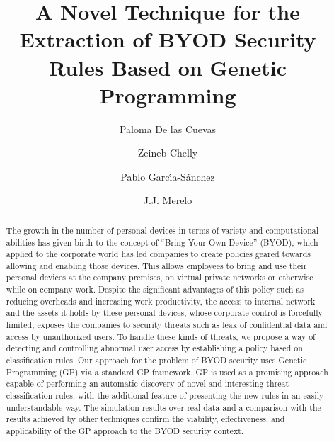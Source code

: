 \documentclass[a4paper,10pt,twocolumn,preprint,3p]{elsarticle}
\begin{document}
\begin{frontmatter}

\title{A Novel Technique for the Extraction of BYOD Security Rules Based on Genetic Programming}

\author[ugr]{Paloma De las Cuevas}
\author[isgt]{Zeineb Chelly}
\author[ugr]{Pablo Garc\'{\i}a-S\'anchez}
\author[ugr]{J.J. Merelo}

\address[ugr]{Department of Computer Architecture and Computer Technology, ETSIIT and CITIC \\
University of Granada, Granada, Spain. Tel: +34958241778. Fax: +34958248993}
\address[isgt]{LARODEC, Institut Sup\'erieur de Gestion de Tunis, Tunisia.}


\begin{abstract}
The growth in the number of personal devices in terms of variety and
computational %
abilities has given birth to the concept of ``Bring Your Own Device''
(BYOD), which applied to the corporate world has led companies to
create policies geared towards allowing and enabling those devices. %
This allows %
employees to bring and use their personal devices at
the company premises, on virtual private networks or otherwise while
on company work. Despite the significant advantages of this policy
such as reducing overheads and increasing work productivity, 
the
access to internal network and the assets it holds by these personal
devices, whose corporate control is forcefully limited, exposes the companies to
security threats such as leak of confidential data and access by
unauthorized users. %
To handle these kinds of threats, we propose a way of detecting and controlling abnormal user
access by establishing a policy based on classification rules. Our
approach for the problem of BYOD security uses Genetic Programming
(GP) via a standard GP framework. GP is used as a promising approach %
capable of performing an automatic discovery of novel and interesting
threat classification rules, with the additional feature of presenting
the new rules in an easily understandable way. %
The simulation results over real data and a
comparison with the results achieved by other techniques confirm the
viability, effectiveness, and applicability of the GP approach to the
BYOD security context.
\end{abstract}



\end{frontmatter}
\end{document}
